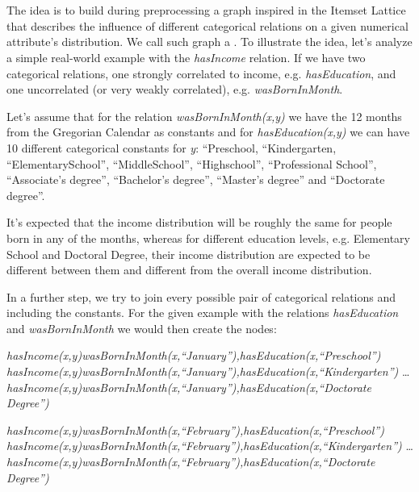 \chapter{\graphname}
\label{cl:intro}

The idea is to build during preprocessing a graph inspired in the Itemset Lattice that describes the influence of different categorical relations on a given numerical attribute's distribution. We call such graph a \graphname.  To illustrate the idea, let's analyze a simple real-world example with the \emph{hasIncome} relation. If we have two categorical relations, one strongly correlated to income, e.g. \emph{hasEducation}, and one uncorrelated (or very weakly correlated), e.g. \emph{wasBornInMonth}.

Let's assume that for the relation \emph{wasBornInMonth(x,y)} we have the 12 months from the Gregorian Calendar as constants and for \emph{hasEducation(x,y)} we can have 10 different categorical constants for \emph{y}: ``Preschool, ``Kindergarten, ``ElementarySchool'', ``MiddleSchool'', ``Highschool'', ``Professional School'', ``Associate's degree'', ``Bachelor's degree'', ``Master's degree'' and ``Doctorate degree''. 

It's expected that the income distribution will be roughly the same for people born in any of the months, whereas for different education levels, e.g. Elementary School and Doctoral Degree, their income distribution are expected to be different between them and different from the overall income distribution.

In a further step, we try to join every possible pair of categorical relations and including the constants. For the given example with the relations \emph{hasEducation} and \emph{wasBornInMonth} we would then create the nodes:

  \emph{hasIncome(x,y)wasBornInMonth(x,``January''),hasEducation(x,``Preschool'')} \newline
  \emph{hasIncome(x,y)wasBornInMonth(x,``January''),hasEducation(x,``Kindergarten'')} \newline
  \dots \newline
  \emph{hasIncome(x,y)wasBornInMonth(x,``January''),hasEducation(x,``Doctorate Degree'')} \newline

  \emph{hasIncome(x,y)wasBornInMonth(x,``February''),hasEducation(x,``Preschool'')} \newline
  \emph{hasIncome(x,y)wasBornInMonth(x,``February''),hasEducation(x,``Kindergarten'')} \newline
  \dots \newline
  \emph{hasIncome(x,y)wasBornInMonth(x,``February''),hasEducation(x,``Doctorate Degree'')} \newline
 
